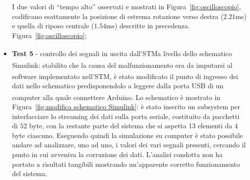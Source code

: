 \begin{itemize}
    I due valori di “tempo alto” osservati e mostrati in Figura~\ref{fig:oscilloscopio}, codificano esattamente la posizione di estrema rotazione verso destra ($2.21$ms) e quella di riposo centrale ($1.54$ms) descritte in precedenza.  Figura~\ref{fig:oscilloscopio};
    \bigskip
    \item \textbf{Test 5} - controllo dei segnali in uscita dall’STM\textsuperscript\textregistered\hspace{1mm}a livello dello schematico Simulink\textsuperscript\textregistered: stabilito che la causa del malfunzionamento era da imputarsi al software implementato nell'STM\textsuperscript\textregistered, è stato modificato il punto di ingresso dei dati nello schematico predisponendolo a leggere dalla porta USB di un computer alla quale connettere Arduino\textsuperscript\textregistered. Lo schematico è mostrato in Figura~\ref{fig:modifica schematico Simulink}: è stato inserito un subsystem per interfacciare lo streaming dei dati sulla porta seriale, costituito da pacchetti di $52$ byte, con la restante parte del sistema che si aspetta 13 elementi da $4$ byte ciascuno.  Eseguendo quindi la simulazione su computer è stato possibile andare ad analizzare, uno ad uno, i valori dei vari segnali presenti, cercando il punto in cui avveniva la corruzione dei dati. L'analisi condotta non ha portato a risultati tangibili mostrando un'apparente corretto funzionamento del sistema.
    
\end{itemize}
\clearpage



